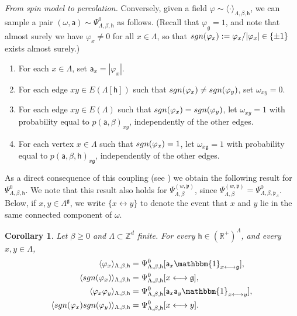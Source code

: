 \documentclass[11pt,a4paper]{article}
\newtheorem{corollary}[theorem]{Corollary}
\theoremstyle{definition}
\numberwithin{equation}{section}
\newcommand\fg{\mathfrak{g}}
\begin{document}
\noindent \textit{From spin model to percolation.} Conversely, given a field $\varphi\sim \langle \cdot \rangle_{\Lambda,\beta,\mathsf{h}}$, we can sample a pair $(\omega, \mathsf{a})\sim \Psi^0_{\Lambda,\beta,\mathsf{h}}$ as follows. (Recall that $\varphi_{\fg}=1$, and note that almost surely we have $\varphi_x\neq 0$ for all $x\in \Lambda$, so that $\textup{sgn}(\varphi_x):= \varphi_x/|\varphi_x|\in \{\pm 1\}$ exists almost surely.) 
\begin{enumerate}
\item[(i)] For each $x\in \Lambda$, set $\mathsf{a}_x=|\varphi_x|$.
\item[(ii)] For each edge $xy\in E(\Lambda[\mathsf{h}])$ such that $\textup{sgn}(\varphi_x) \neq \textup{sgn}(\varphi_y)$, set $\omega_{xy}=0$. 
\item[(iii)] For each edge $xy\in E(\Lambda)$ such that $\textup{sgn}(\varphi_x) = \textup{sgn}(\varphi_y)$, let $\omega_{xy}=1$ with probability equal to $p(\mathsf{a},\beta)_{xy}$, independently of  the other edges.
\item[(iv)] For each vertex $x\in \Lambda$ such that $\textup{sgn}(\varphi_x) = 1$, let $\omega_{x\mathfrak g}=1$
with probability equal to $p(\mathsf{a},\beta,\mathsf{h})_{x\fg}$, independently of the other edges.
\end{enumerate}



As a direct consequence of this coupling (see \cite[Theorem 1.16]{Grimmett2006RCM}) we obtain the following result for $\Psi^0_{\Lambda,\beta,\mathsf{h}}$.
We note that this result also holds for $\Psi^{(w,\mathfrak{p})}_{\Lambda,\beta}$, since $\Psi^{(w,\mathfrak{p})}_{\Lambda,\beta}=\Psi^0_{\Lambda,\beta,\mathfrak{p}_{\Lambda}}$. Below, if $x,y\in \Lambda^\fg$, we write $\{x\leftrightarrow y\}$ to denote the event that $x$ and $y$ lie in the same connected component of $\omega$.


\begin{corollary} \label{cor: ES correlations}
Let $\beta\geq 0$ and $\Lambda\subset \mathbb{Z}^d$ finite. For every $\mathsf h \in (\mathbb R^+)^\Lambda$, and every $x,y\in \Lambda$, 
\begin{align}
\label{eq: es cor: 1}
\langle \varphi_x \rangle_{\Lambda,\beta,\mathsf{h}}
&=
\Psi^0_{\Lambda,\beta,\mathsf{h}}[\mathsf{a}_x \mathbbm{1}_{x\longleftrightarrow \fg}], 
\\
\label{eq: es cor: 2}
\langle \textup{sgn}(\varphi_x) \rangle_{\Lambda,\beta,\mathsf{h}}
&=
\Psi^0_{\Lambda,\beta,\mathsf{h}}[x\longleftrightarrow \fg], 
\\ \label{eq: es cor: 3}
\langle \varphi_x \varphi_y \rangle_{\Lambda,\beta,\mathsf{h}}
&=
\Psi^0_{\Lambda,\beta,\mathsf{h}}[\mathsf{a}_x \mathsf{a}_y \mathbbm{1}_{x\longleftrightarrow y}], 
\\ \label{eq: es cor: 4}
\langle \textup{sgn}(\varphi_x) \textup{sgn}(\varphi_y) \rangle_{\Lambda,\beta,\mathsf{h}}
&=
\Psi^0_{\Lambda,\beta,\mathsf{h}}[x\longleftrightarrow y]. 
\end{align}   
\end{corollary}
\end{document}
